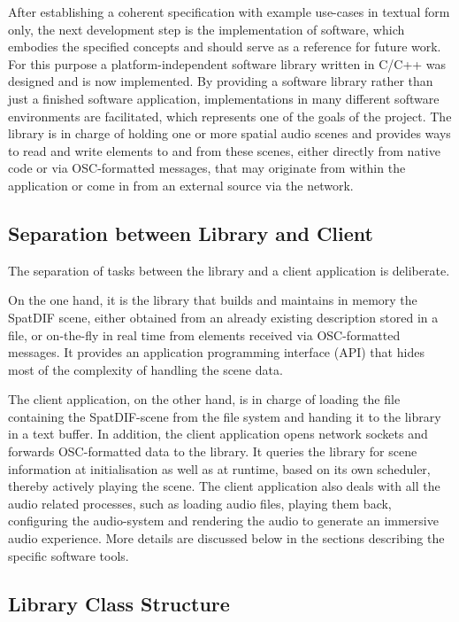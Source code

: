 \documentclass{article}
\begin{document}
After establishing a coherent specification with example use-cases in textual form only, the next development step is the implementation of software, which embodies the specified concepts and should serve as a reference for future work.
For this purpose a platform-independent software library written in C/C++ was designed and is now implemented. \cite{Miyama_2013}
By providing a software library rather than just a finished software application, implementations in many different software environments are facilitated, which represents one of the goals of the project.
The library is in charge of holding one or more spatial audio scenes and provides ways to read and write elements to and from these scenes, either directly from native code or via OSC-formatted messages, that may originate from within the application or come in from an external source via the network.

\subsection{Separation between Library and Client}\label{subsec:separation}

The separation of tasks between the library and a client application is deliberate.

On the one hand, it is the library that builds and maintains in memory the SpatDIF scene, either obtained from an already existing description stored in a file, or on-the-fly in real time from elements received via OSC-formatted messages.
It provides an application programming interface (API) that hides most of the complexity of handling the scene data.

The client application, on the other hand, is in charge of loading the file containing the SpatDIF-scene from the file system and handing it to the library in a text buffer.
In addition, the client application opens network sockets and forwards OSC-formatted data to the library.
It queries the library for scene information at initialisation as well as at runtime, based on its own scheduler, thereby actively playing the scene.
The client application also deals with all the audio related processes, such as loading audio files, playing them back, configuring the audio-system and rendering the audio to generate an immersive audio experience.
More details are discussed below in the sections describing the specific software tools.


\subsection{Library Class Structure}\label{subsec:class_structure}
\end{document}
